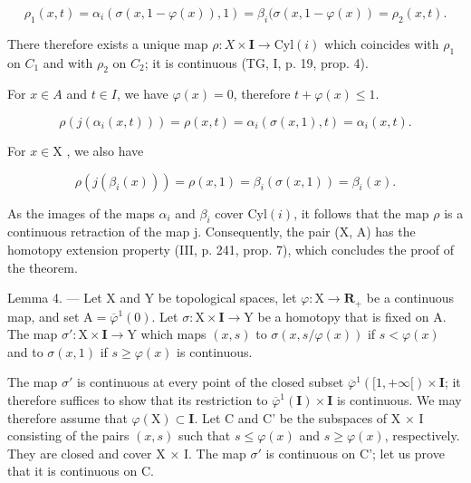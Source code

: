 \[
\rho_ {1} (x, t) = \alpha_ {i} (\sigma (x, 1 - \varphi (x)), 1) = \beta_ {i} (\sigma (x, 1 - \varphi (x)) = \rho_ {2} (x, t).
\]

There therefore exists a unique map \(\rho\colon X\times\mathbf{I}\to\mathrm{Cyl}(i)\) which coincides with \(\rho_{1}\) on \(C_{1}\) and with \(\rho_{2}\) on \(C_{2}\); it is continuous (TG, I, p. 19, prop. 4).

For \(x \in A\) and \(t \in I\), we have \(\varphi(x) = 0\), therefore \(t + \varphi(x) \leqslant 1\).

\[
\rho (j (\alpha_ {i} (x, t))) = \rho (x, t) = \alpha_ {i} (\sigma (x, 1), t) = \alpha_ {i} (x, t).
\]

For \(x\in \mathrm{X}\) , we also have

\[
\rho (j (\beta_ {i} (x))) = \rho (x, 1) = \beta_ {i} (\sigma (x, 1)) = \beta_ {i} (x).
\]

As the images of the maps \(\alpha_{i}\) and \(\beta_{i}\) cover \(\mathrm{Cyl}(i)\), it follows that the map \(\rho\) is a continuous retraction of the map j. Consequently, the pair (X, A) has the homotopy extension property (III, p. 241, prop. 7), which concludes the proof of the theorem.

Lemma 4. --- Let X and Y be topological spaces, let \(\varphi\colon\mathrm{X}\to\mathbf{R}_{+}\) be a continuous map, and set \(\mathrm{A}=\overline{\varphi}^{1}(0)\). Let \(\sigma\colon\mathrm{X}\times\mathbf{I}\to\mathrm{Y}\) be a homotopy that is fixed on A. The map \(\sigma'\colon\mathrm{X}\times\mathbf{I}\to\mathrm{Y}\) which maps \((x,s)\) to \(\sigma(x,s/\varphi(x))\) if \(s<\varphi(x)\) and to \(\sigma(x,1)\) if \(s\geqslant\varphi(x)\) is continuous.

The map \(\sigma'\) is continuous at every point of the closed subset \(\overline{\varphi}^{1}([1, +\infty[)\times\mathbf{I}\); it therefore suffices to show that its restriction to \(\overline{\varphi}^{1}(\mathbf{I})\times\mathbf{I}\) is continuous. We may therefore assume that \(\varphi(\mathrm{X})\subset\mathbf{I}\). Let C and C' be the subspaces of X × I consisting of the pairs \((x,s)\) such that \(s\leqslant\varphi(x)\) and \(s\geqslant\varphi(x)\), respectively. They are closed and cover X × I. The map \(\sigma'\) is continuous on C'; let us prove that it is continuous on C.

